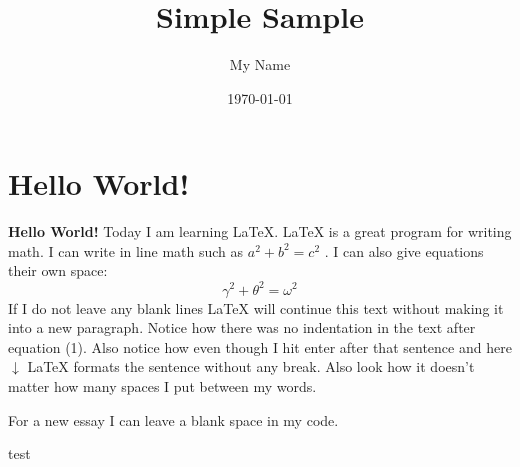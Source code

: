 \documentclass{article} %
\title{Simple Sample} %
\author{My Name} %
\date{\today} %
\begin{document}
\maketitle %

\section{Hello World!} %

\textbf{Hello World!} Today I am learning \LaTeX. %
\LaTeX{} is a great program for writing math. I can write in line math such as $a^2+b^2=c^2$ %
. I can also give equations their own space:
\begin{equation} %
  \gamma^2+\theta^2=\omega^2
\end{equation}
If I do not leave any blank lines \LaTeX{} will continue  this text without making it into a new paragraph.  Notice how there was no indentation in the text after equation (1).
Also notice how even though I hit enter after that sentence and here $\downarrow$
\LaTeX{} formats the sentence without any break.  Also   look  how      it   doesn't     matter          how    many  spaces     I put     between       my    words.

For a new essay I can leave a blank space in my code.

test
\end{document}
